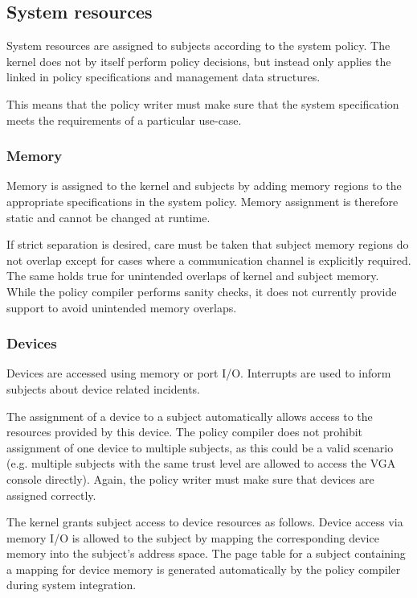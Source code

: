 \subsection{System resources}\label{subsec:system-resources}
System resources are assigned to subjects according to the system policy. The
kernel does not by itself perform policy decisions, but instead only applies
the linked in policy specifications and management data structures.

This means that the policy writer must make sure that the system specification
meets the requirements of a particular use-case.

\subsubsection{Memory}
Memory is assigned to the kernel and subjects by adding memory regions to the
appropriate specifications in the system policy. Memory assignment is therefore
static and cannot be changed at runtime.

If strict separation is desired, care must be taken that subject memory regions
do not overlap except for cases where a communication channel is explicitly
required. The same holds true for unintended overlaps of kernel and subject
memory.  While the policy compiler performs sanity checks, it does not currently
provide support to avoid unintended memory overlaps.

\subsubsection{Devices}
Devices are accessed using memory or port I/O. Interrupts are used to inform
subjects about device related incidents.

The assignment of a device to a subject automatically allows access to the
resources provided by this device. The policy compiler does not prohibit
assignment of one device to multiple subjects, as this could be a valid scenario
(e.g.  multiple subjects with the same trust level are allowed to access the VGA
console directly). Again, the policy writer must make sure that devices are
assigned correctly.

The kernel grants subject access to device resources as follows. Device access
via memory I/O is allowed to the subject by mapping the corresponding device
memory into the subject's address space. The page table for a subject containing
a mapping for device memory is generated automatically by the policy compiler
during system integration.

